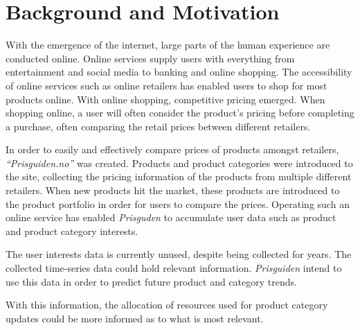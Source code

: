 \section{Background and Motivation}\label{cit}
\label{section:Introduction:BackgroundAndMotivation}

With the emergence of the internet, large parts of the human experience are conducted online.
Online services supply users with everything from entertainment and social media to banking and online shopping.
The accessibility of online services such as online retailers has enabled users to shop for most products online.
With online shopping, competitive pricing emerged.
When shopping online, a user will often consider the product's pricing before completing a purchase, often comparing the retail prices between different retailers.


In order to easily and effectively compare prices of products amongst retailers,
\textit{``Prisguiden.no''} was created.
Products and product categories were introduced to the site, collecting the pricing information of the products from multiple different retailers.
When new products hit the market, these products are introduced to the product portfolio in order for users to compare the prices.
Operating such an online service has enabled \textit{Prisguden} to accumulate user data such as product and product category interests.

The user interests data is currently unused, despite being collected for years.
The collected time-series data could hold relevant information.
\textit{Prisguiden} intend to use this data in order to predict future product and category trends.

With this information, the allocation of resources used for product category updates could be more informed
as to what is most relevant.



